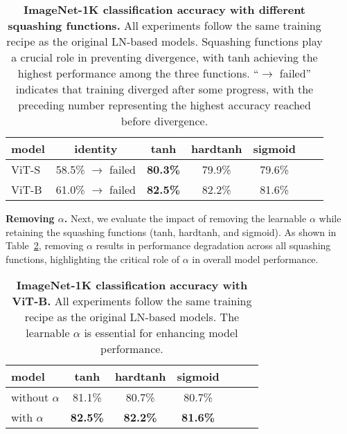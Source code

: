 \documentclass[]{fairmeta}
\newcommand{\tablestyle}[2]{\setlength{\tabcolsep}{#1}\renewcommand{\arraystretch}{#2}\centering\footnotesize}
\renewcommand{\paragraph}[1]{\vspace{1.25mm}\noindent\textbf{#1}}
\begin{document}
\begin{table}[h]

\centering
\tablestyle{10pt}{1.15}
\begin{tabular}{lcccccc}
\toprule
model & identity & tanh & hardtanh & sigmoid \\
\midrule
ViT-S  & 58.5\% $\rightarrow$ failed & \textbf{80.3\%} & 79.9\% & 79.6\% \\
ViT-B  & 61.0\% $\rightarrow$ failed & \textbf{82.5\%} & 82.2\% & 81.6\% \\
\midrule
\end{tabular}
\caption{\textbf{ImageNet-1K classification accuracy with different squashing functions.} All experiments follow the same training recipe as the original LN-based models. Squashing functions play a crucial role in preventing divergence, with tanh achieving the highest performance among the three functions. ``$\rightarrow$ failed'' indicates that training diverged after some progress, with the preceding number representing the highest accuracy reached before divergence.}
\label{tab:function_ablation}
\end{table}

\paragraph{Removing $\alpha$.} Next, we evaluate the impact of removing the learnable $\alpha$ while retaining the squashing functions (tanh, hardtanh, and sigmoid).
As shown in Table~\ref{tab:alpha_ablation}, removing $\alpha$ results in performance degradation across all squashing functions, highlighting the critical role of $\alpha$ in overall model performance.

\begin{table}[h]
\centering
\tablestyle{7pt}{1.15}
\begin{tabular}{lcccccc}
\toprule
model & tanh & hardtanh & sigmoid \\
\midrule
without $\alpha$ &  81.1\% & 80.7\% & 80.7\% \\
with $\alpha$  & \textbf{82.5\%} & \textbf{82.2\%} & \textbf{81.6\%} \\
\midrule
\end{tabular}
\caption{\textbf{ImageNet-1K classification accuracy with ViT-B.} All experiments follow the same training recipe as the original LN-based models. The learnable $\alpha$ is essential for enhancing model performance.}
\label{tab:alpha_ablation}
\end{table}
\end{document}
